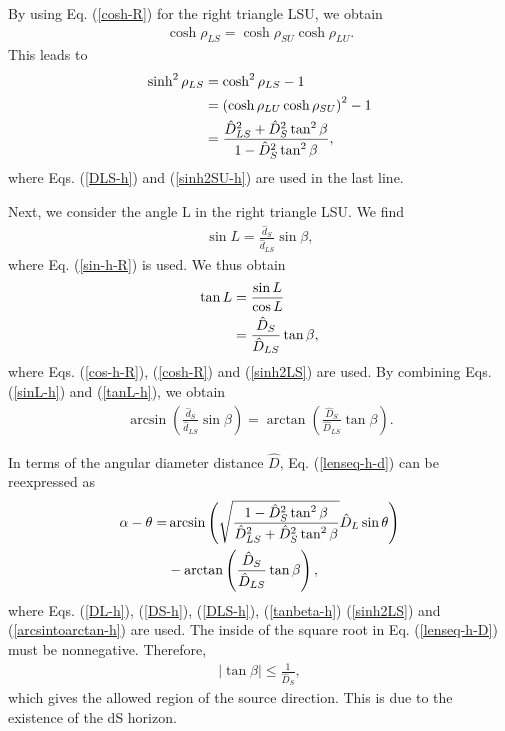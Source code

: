 \documentclass[twocolumn,showpacs,preprintnumbers,amsmath,amssymb]{revtex4-1}
\begin{document}
By using Eq. (\ref{cosh-R}) for the right triangle LSU, 
we obtain 
\begin{align}
\cosh\rho_{LS} = \cosh\rho_{SU} \cosh\rho_{LU} . 
\label{coshLS}
\end{align}
This leads to 
\begin{align}
\sinh^2\rho_{LS} 
&=
\cosh^2\rho_{LS} - 1 
\notag\\
&=
\left(\cosh\rho_{LU} \cosh\rho_{SU}\right)^2 - 1 
\notag\\
&=
\frac{\hat D_{LS}^2 + \hat D_S^2 \tan^2\beta}
{1 - \hat D_S^2 \tan^2\beta} ,
\label{sinh2LS}
\end{align}
where Eqs. (\ref{DLS-h}) and (\ref{sinh2SU-h}) are 
used in the last line. 


Next, we consider the angle L in the right triangle LSU. 
We find 
\begin{align}
\sin L = \frac{\hat d_S}{\hat d_{LS}} \sin\beta ,
\label{sinL-h}
\end{align}
where Eq. (\ref{sin-h-R}) is used. 
We thus obtain  
\begin{align}
\tan L 
&= 
\frac{\sin L}{\cos L} 
\notag\\
&= 
\frac{\hat D_S}{\hat D_{LS}} \tan\beta , 
\label{tanL-h}
\end{align}
where Eqs. (\ref{cos-h-R}), (\ref{cosh-R}) and (\ref{sinh2LS}) are used. 
By combining Eqs. (\ref{sinL-h}) and (\ref{tanL-h}), 
we obtain
\begin{align}
\arcsin
\left(
\frac{\hat d_S}{\hat d_{LS}} \sin\beta 
\right)
=
\arctan
\left(
\frac{\hat D_S}{\hat D_{LS}} \tan\beta 
\right) .
\label{arcsintoarctan-h}
\end{align}



In terms of the angular diameter distance $\hat D$, 
Eq. (\ref{lenseq-h-d}) can be reexpressed as 
\begin{align}
\alpha - \theta 
=& 
\arcsin\left(
\sqrt{
\frac{1 - \hat D_S^2 \tan^2\beta}{\hat D_{LS}^2 + \hat D_S^2 \tan^2\beta}
}
\hat D_L\sin\theta\right) 
\notag\\
& 
- 
\arctan\left(\frac{\hat D_S}{\hat D_{LS}}\tan\beta\right) ,
\label{lenseq-h-D}
\end{align}
where Eqs. (\ref{DL-h}), (\ref{DS-h}), (\ref{DLS-h}), (\ref{tanbeta-h}) 
(\ref{sinh2LS}) and (\ref{arcsintoarctan-h}) are used. 
The inside of the square root in Eq. (\ref{lenseq-h-D}) must be nonnegative. 
Therefore, 
\begin{align}
|\tan\beta| \leq \frac{1}{\hat D_S} , 
\label{beta-bound}
\end{align}
which gives the allowed region of the source direction. 
This is due to the existence of the dS horizon. 
\end{document}
